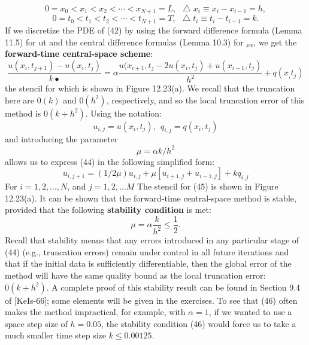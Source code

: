 \documentclass[../main.tex]{subfiles}
\begin{document}
$$0 = x_0 < x_1 < x_2 < \cdots < x_{N+1} =L,~~  \bigtriangleup x_i \equiv x_i - x_{i-1} = h,  $$
\begin{equation}\label{eqa43}
0 = t_0 < t_1 < t_2 < \cdots < t_{N+1} =T,~~  \bigtriangleup t_i \equiv t_i - t_{i-1} = k.
\end{equation}
If we discretize the PDE of (42) by using the forward difference formula (Lemma 11.5) for ut and the central difference formulas (Lemma 10.3) for $_{xx}$, we get the \textbf{forward-time central-space scheme}: 
\begin{equation}\label{eqa44}
\dfrac{u(x_i,t_{j+1})-u(x_i,t_{j})}{k•}=\alpha 
 \dfrac{u(x_{i+1},t_{j}-2u(x_{i},t_{j})+u(x_{i-1},t_{j})}{h^2}+q(x_,t_j)
\end{equation}
the stencil for which is shown in Figure 12.23(a). We recall that the truncation  here are $0(k)$ and $0(h^2)$, respectively, and so the local truncation error of this method is $0(k + h^2)$. Using the notation:
$$u_{i,j}=u(x_i,t_j), ~~q_{i,j}=q(x_i, t_j)$$
and introducing the parameter 
$$\mu=\alpha k/h^2$$
allows us to express (44) in the following simplified form: 
\begin{equation}\label{eqa45}
u_{i,j+1}=(1/2\mu)u_{i,j}+\mu[u_{i+1,j}+u_{i-1,j}]+kq_{i,j}
\end{equation}
For $i= 1,2, ...,N$, and $j= 1,2, ...M$ The stencil for (45) is shown in Figure 12.23(a). It can be shown that the forward-time central-space method is stable, 
provided that the following \textbf{stability condition} is met:
\begin{equation}\label{eqa46}
\mu=\alpha \dfrac{k}{h^2}\leqslant\dfrac{1}{2}.
\end{equation}
Recall that stability means that any errors introduced in any particular stage of (44) (e.g., truncation errors) remain under control in all future iterations and that if the initial data is sufficiently differentiable, then the global error of the method will have the same quality bound as the local truncation error: $0(k + h^2)$. A complete proof of this stability result can be found in Section 9.4 of [KeIs-66]; some elements will be given in the exercises. To see that (46) often makes the method impractical, for example, with $\alpha = 1$, if we wanted to use a space step size of $h= 0.05$, the stability condition (46) would force us to take a much smaller time step 
size $k\leqslant 0.00125$. 
\end{document}
